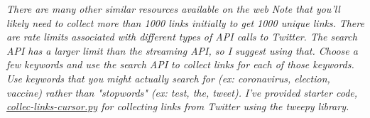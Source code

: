 \documentclass[12pt]{article}
\begin{document}
\emph{There are many other similar resources available on the web}
\newline
\emph{Note that you'll likely need to collect more than 1000 links initially to get 1000 unique links.}
\newline
\emph{There are rate limits associated with different types of API calls to Twitter. The search API has a larger limit than the streaming API, so I suggest using that. Choose a few keywords and use the search API to collect links for each of those keywords. Use keywords that you might actually search for (ex: coronavirus, election, vaccine) rather than "stopwords" (ex: test, the, tweet).}
\newline
\emph{I've provided starter code, \href{}{collec-links-cursor.py} for collecting links from Twitter using the tweepy library.}
\end{document}

